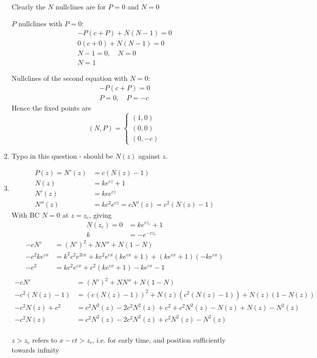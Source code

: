 \documentclass{X:/Documents/Coding/Latex/myassignment}
\begin{document}
\begin{enumerate}
\begin{enumerate}
		Clearly the $N$ nullclines are for $P = 0$ and $N=0$
		
		$P$ nullclines with $P = 0$:
		\begin{align*}
			  - P\left(c + P\right) + N(N - 1) = 0\\
			 0\left(c + 0\right) +N(N - 1) = 0\\
			 N - 1 = 0, \quad N = 0\\
			 N = 1
		\end{align*}

		Nullclines of the second equation with $N = 0$:
		\begin{align*}
			- P\left(c + P\right)= 0\\
			P = 0, \quad P = -c
		\end{align*}
		Hence the fixed points are
		\[(N,P) = \begin{cases}
			(1,0)\\
			(0,0)\\
			(0,-c)			
		\end{cases}\]
		\item Typo in this question - should be $N(z)$ against $z$.
		\item 
		
		\begin{align*}
			P(z) =N'(z) &= c(N(z) - 1)\\
			N(z) &= k e^{cz} + 1\\
			N'(z) &= kc e^{cz}\\
			N''(z) &= kc^2 e^{cz} = cN'(z) = c^2(N(z)-1)
		\end{align*}
		With BC $N=0$ at $z = z_c$, giving 
		\begin{align*}
			N(z_c) = 0 &= k e^{cz_c} + 1\\
			k &= -e^{-cz_c}
		\end{align*}
		\begin{align*}
		-c N' &= \left(N' \right)^2 + N N'' + N(1-N)\\
		-c^2 k e^{cx} &= k^2c^2 e^{2cx} + kc^2e^{cx}(ke^{cx} + 1) + (k e^{cx} + 1)(-ke^{cx})\\
		-c^2  &= kc^2 e^{cx} + c^2(ke^{cx} + 1) -k e^{cx} - 1\\
		\end{align*}
		\begin{align*}
		-c N' &= \left(N' \right)^2 + N N'' + N(1-N)\\
		-c^2(N(z) - 1) &= \left(c(N(z)-1)\right)^2 + N(z)(c^2(N(z) -1)) + N(z)(1-N(z))\\
		-c^2 N(z) + c^2 &= c^2N^2(z) - 2c^2N^2(z) + c^2 + c^2N^2(z) - N(z) + N(z) - N^2(z)\\
		-c^2 N(z) &= c^2N^2(z) - 2c^2N^2(z)+ c^2N^2(z) - N^2(z)\\
		\end{align*}

		$z > z_c$ refers to $x - ct > z_c$, i.e. for early time, and position sufficiently towards infinity 
	\end{enumerate}
\end{enumerate}




\end{document}
